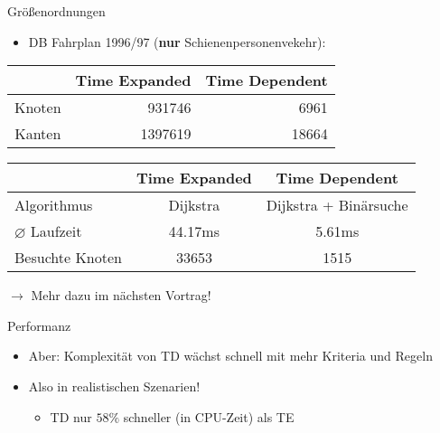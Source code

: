 \begin{frame}{Größenordnungen}
	\begin{itemize}
		\item DB Fahrplan 1996/97 (\textbf{nur} Schienenpersonenvekehr):
	\end{itemize}
	
	\begin{center}
		\begin{tabular}{ c|r|r } 
			& Time Expanded & Time Dependent \\
 			\hline
 			\hline
 			Knoten & 931746 & 6961 \\
 			Kanten & 1397619 & 18664 \\
 			\hline
		\end{tabular}
	\end{center}
	
	\vspace{2em}	
	
	\begin{center}
		\begin{tabular}{ l|c|c } 
			& Time Expanded & Time Dependent \\
 			\hline
 			\hline
 			Algorithmus & Dijkstra & Dijkstra + Binärsuche \\
 			$\varnothing{}$ Laufzeit & 44.17ms & 5.61ms \\
 			Besuchte Knoten & 33653 & 1515 \\
 			\hline
		\end{tabular}
	\end{center}

	$\rightarrow$ Mehr dazu im nächsten Vortrag!
\end{frame}


\begin{frame}{Performanz}
	\begin{itemize}
		\item Aber: Komplexität von TD wächst schnell mit mehr Kriteria und Regeln
		\item Also in realistischen Szenarien!
		\begin{itemize}
			\item TD nur $58\%$ schneller (in CPU-Zeit) als TE
		\end{itemize}
	\end{itemize}

\end{frame}

